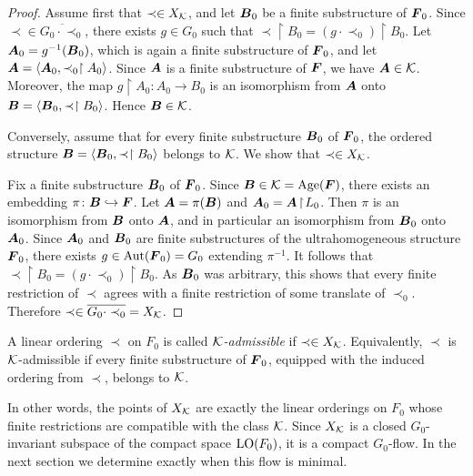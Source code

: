 \begin{proof}
    Assume first that \(\prec\in X_{\mathcal{K}}\), and let \(\boldsymbol{B}_0\) be a finite substructure
    of \(\boldsymbol{F}_0\). Since \(\prec\in \overline{G_0\cdot \prec_0}\), there exists
    \(g\in G_0\) such that
    \(\prec\restriction B_0=(g\cdot \prec_0)\restriction B_0\). Let
    \(\boldsymbol{A}_0=g^{-1}(\boldsymbol{B}_0)\), which is again a finite substructure of \(\boldsymbol{F}_0\),
    and let \(\boldsymbol{A}=\langle \boldsymbol{A}_0,\prec_0\restriction A_0\rangle\).
    Since \(\boldsymbol{A}\) is a finite substructure of \(\boldsymbol{F}\), we have \(\boldsymbol{A}\in\mathcal{K}\). Moreover, the map
    \(g\restriction A_0\colon A_0\to B_0\) is an isomorphism from \(\boldsymbol{A}\) onto
    \(\boldsymbol{B}=\langle \boldsymbol{B}_0,\prec\restriction B_0\rangle\).
    Hence \(\boldsymbol{B}\in\mathcal{K}\).

    Conversely, assume that for every finite substructure \(\boldsymbol{B}_0\) of \(\boldsymbol{F}_0\), the ordered structure
    \(\boldsymbol{B}=\langle \boldsymbol{B}_0,\prec\restriction B_0\rangle\) belongs to \(\mathcal{K}\). We show that
    \(\prec\in X_{\mathcal{K}}\).

    Fix a finite substructure \(\boldsymbol{B}_0\) of \(\boldsymbol{F}_0\). Since \(\boldsymbol{B}\in\mathcal{K}=\operatorname{Age}(\boldsymbol{F})\), there exists an embedding
    \(\pi\colon \boldsymbol{B}\hookrightarrow \boldsymbol{F}\). Let \(\boldsymbol{A}=\pi(\boldsymbol{B})\) and
    \(\boldsymbol{A}_0=\boldsymbol{A}\!\restriction\!L_0\).
    Then \(\pi\) is an isomorphism from \(\boldsymbol{B}\) onto \(\boldsymbol{A}\), and in particular an isomorphism from \(\boldsymbol{B}_0\) onto \(\boldsymbol{A}_0\). Since \(\boldsymbol{A}_0\) and \(\boldsymbol{B}_0\) are finite substructures of the ultrahomogeneous structure \(\boldsymbol{F}_0\), there exists
    \(g\in \operatorname{Aut}(\boldsymbol{F}_0)=G_0\) extending \(\pi^{-1}\). It follows that
    \(\prec\restriction B_0=(g\cdot \prec_0)\restriction B_0\).
    As \(\boldsymbol{B}_0\) was arbitrary, this shows that every finite restriction of \(\prec\) agrees with a finite restriction of some translate of \(\prec_0\). Therefore
    \(\prec\in \overline{G_0\cdot \prec_0}=X_{\mathcal{K}}\).
\end{proof}

\begin{definition}
    \label{def:k-admissible-ordering}
    A linear ordering \(\prec\) on \(F_0\) is called \emph{\(\mathcal{K}\)-admissible} if
    \(\prec\in X_{\mathcal{K}}\).
    Equivalently, \(\prec\) is \(\mathcal{K}\)-admissible if every finite substructure of \(\boldsymbol{F}_0\), equipped with the induced ordering from \(\prec\), belongs to \(\mathcal{K}\).
\end{definition}

In other words, the points of \(X_{\mathcal{K}}\) are exactly the linear orderings on \(F_0\) whose finite restrictions are compatible with the class \(\mathcal{K}\). Since \(X_{\mathcal{K}}\) is a closed \(G_0\)-invariant subspace of the compact space \(\operatorname{LO}(F_0)\), it is a compact \(G_0\)-flow. In the next section we determine exactly when this flow is minimal.

